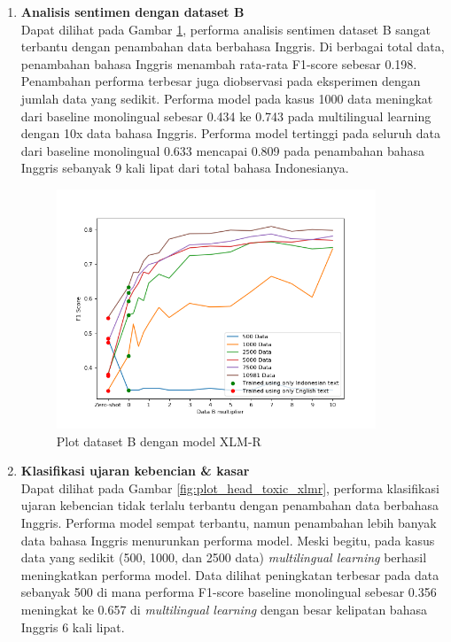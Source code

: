 \begin{enumerate}
            \item \textbf{Analisis sentimen dengan dataset B} \\
            Dapat dilihat pada Gambar \ref{fig:plot_head_prosa_xlmr}, performa analisis sentimen dataset B sangat terbantu dengan penambahan data berbahasa Inggris. Di berbagai total data, penambahan bahasa Inggris menambah rata-rata F1-score sebesar 0.198. Penambahan performa terbesar juga diobservasi pada eksperimen dengan jumlah data yang sedikit. Performa model pada kasus 1000 data meningkat dari baseline monolingual sebesar 0.434 ke 0.743 pada multilingual learning dengan 10x data bahasa Inggris. Performa model tertinggi pada seluruh data dari baseline monolingual 0.633 mencapai 0.809 pada penambahan bahasa Inggris sebanyak 9 kali lipat dari total bahasa Indonesianya.

            \begin{figure}[ht]
                \centering
                \includegraphics[width=0.9\textwidth]{resources/plot-head-prosa-xlmr.png}
                \caption{Plot dataset B dengan model XLM-R}
                \label{fig:plot_head_prosa_xlmr}
            \end{figure}

         
            \item \textbf{Klasifikasi ujaran kebencian \& kasar} \\
            Dapat dilihat pada Gambar \ref{fig:plot_head_toxic_xlmr}, performa klasifikasi ujaran kebencian tidak terlalu terbantu dengan penambahan data berbahasa Inggris. Performa model sempat terbantu, namun penambahan lebih banyak data bahasa Inggris menurunkan performa model. Meski begitu, pada kasus data yang sedikit (500, 1000, dan 2500 data) \textit{multilingual learning} berhasil meningkatkan performa model. Data dilihat peningkatan terbesar pada data sebanyak 500 di mana performa F1-score baseline monolingual sebesar 0.356 meningkat ke 0.657 di \textit{multilingual learning} dengan besar kelipatan bahasa Inggris 6 kali lipat.


\end{enumerate}
